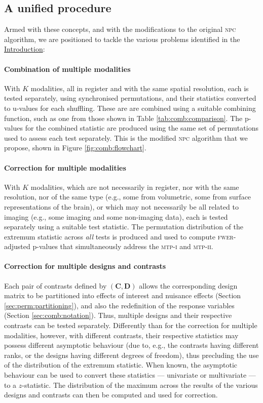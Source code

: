 \subsection{A unified procedure}

Armed with these concepts, and with the modifications to the original \textsc{npc} algorithm, we are positioned to tackle the various problems identified in the \href{sec:comb:intro}{Introduction}:

\paragraph{Combination of multiple modalities} With $K$ modalities, all in register and with the same spatial resolution, each is tested separately, using synchronised permutations, and their statistics converted to u-values for each shuffling. These are are combined using a suitable combining function, such as one from those shown in Table \ref{tab:comb:comparison}. The p-values for the combined statistic are produced using the same set of permutations used to assess each test separately. This is the modified \textsc{npc} algorithm that we propose, shown in Figure \ref{fig:comb:flowchart}.

\paragraph{Correction for multiple modalities} With $K$ modalities, which are not necessarily in register, nor with the same resolution, nor of the same type (e.g., some from volumetric, some from surface representations of the brain), or which may not necessarily be all related to imaging (e.g., some imaging and some non-imaging data), each is tested separately using a suitable test statistic. The permutation distribution of the extremum statistic across \emph{all} tests is produced and used to compute \textsc{fwer}-adjusted p-values that simultaneously address the \textsc{mtp-i} and \textsc{mtp-ii}.

\paragraph{Correction for multiple designs and contrasts} Each pair of contrasts defined by $\left(\mathbf{C}, \mathbf{D}\right)$ allows the corresponding design matrix to be partitioned into effects of interest and nuisance effects (Section \ref{sec:perm:partitioning}), and also the redefinition of the response variables (Section \ref{sec:comb:notation}). Thus, multiple designs and their respective contrasts can be tested separately. Differently than for the correction for multiple modalities, however, with different contrasts, their respective statistics may possess different asymptotic behaviour (due to, e.g., the contrasts having different ranks, or the designs having different degrees of freedom), thus precluding the use of the distribution of the extremum statistic. When known, the asymptotic behaviour can be used to convert these statistics --- univariate or multivariate --- to a $z$-statistic. The distribution of the maximum across the results of the various designs and contrasts can then be computed and used for correction.

